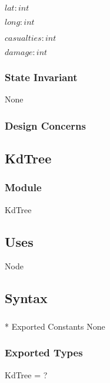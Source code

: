 \documentclass[12pt]{article}
\begin{document}
                $lat: int$
                
                $long: int$
                
                $casualties: int$
                
                $damage: int$
                
                \subsubsection* {State Invariant}
                None
                \subsubsection* {Design Concerns}
                
                \newpage
                \subsection* {KdTree}
                
                \subsubsection*{Module}
                KdTree
                
                \subsection* {Uses}
                Node
                
                \subsection* {Syntax}
                
                \subsubsection{}* {Exported Constants}
                None
                \subsubsection* {Exported Types}
                KdTree = ?
\end{document}
